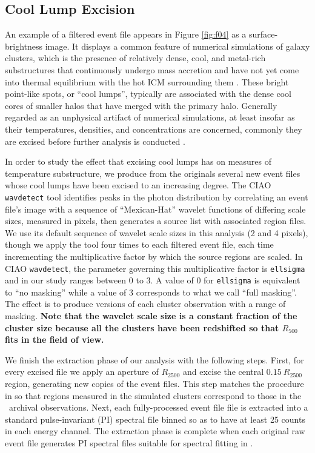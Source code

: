 \documentclass[12pt,preprint]{aastex}
\begin{document}
\subsection{Cool Lump Excision}
\label{sec:cool_lump_intro}

An example of a filtered event file appears in Figure \ref{fig:f04} as
a surface-brightness image.  It displays a common feature of numerical
simulations of galaxy clusters, which is the presence of relatively
dense, cool, and metal-rich substructures that continuously undergo
mass accretion and have not yet come into thermal equilibrium with the
hot ICM surrounding them \citep{2009arXiv0906.4370B}.  These bright
point-like spots, or ``cool lumps'', typically are associated with the
dense cool cores of smaller halos that have merged with the primary
halo.  Generally regarded as an unphysical artifact of numerical
simulations, at least insofar as their temperatures, densities, and
concentrations are concerned, commonly they are excised before further
analysis is conducted \citep{2006MNRAS.369.2013R, piffaretti_valdarnini_substructure_2008, nagai_effects_2007}.

In order to study the effect that excising cool lumps has on measures
of temperature substructure, we produce from the originals several new
event files whose cool lumps have been excised to an increasing
degree.  The CIAO \verb|wavdetect| tool identifies peaks in the photon
distribution by correlating an event file's image with a sequence of
``Mexican-Hat'' wavelet functions of differing scale sizes, measured
in pixels, then generates a source list with associated region files.
We use its default sequence of wavelet scale sizes in this analysis (2
and 4 pixels), though we apply the tool four times to each filtered
event file, each time incrementing the multiplicative factor by which
the source regions are scaled.  In CIAO \verb|wavdetect|, the
parameter governing this multiplicative factor is \verb|ellsigma| and
in our study ranges between 0 to 3. A value of 0 for \verb|ellsigma|
is equivalent to ``no masking'' while a value of 3 corresponds to what
we call ``full masking''.  The effect is to produce versions of each
cluster observation with a range of masking. 
{\bf Note that the wavelet scale size is a constant fraction of the cluster size because all the clusters have been redshifted so that $R_{500}$ fits in the field of view.}

We finish the extraction phase of our analysis with the following
steps.  First, for every excised file we apply an aperture of
$R_{2500}$ and excise the central $0.15\ R_{2500}$ region, generating
new copies of the event files.  This step matches the procedure in
\citet{cavagnolo_bandpass_2008} so that regions measured in the
simulated clusters correspond to those in the \chandra\ archival
observations.  Next, each fully-processed event file file is extracted
into a standard pulse-invariant (PI) spectral file binned so as to
have at least 25 counts in each energy channel.  The extraction phase
is complete when each original raw event file generates PI spectral
files suitable for spectral fitting in \xspec.
\end{document}
